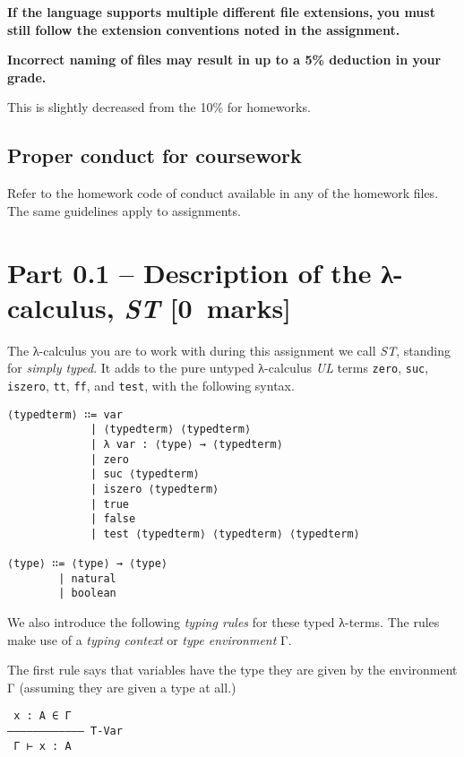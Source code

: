 \documentclass[11pt]{article}
\theoremstyle{definition}
\begin{document}
\begin{center}
\textbf{If the language supports multiple different file extensions,}
\textbf{you must still follow the extension conventions noted in the assignment.}
\end{center}

\begin{center}
\textbf{Incorrect naming of files may result in up to a 5\% deduction in your grade.}
\end{center}
This is slightly decreased from the 10\% for homeworks.

\subsection*{Proper conduct for coursework}
\label{sec:org7f9eaf0}
Refer to the homework code of conduct available in any of the homework files.
The same guidelines apply to assignments.

\section*{Part 0.1 – Description of the λ-calculus, \emph{ST}                 [0 marks]}
\label{sec:org1ee9623}
The λ-calculus you are to work with during this assignment
we call \emph{ST}, standing for \emph{simply typed}.
It adds to the pure untyped λ-calculus \emph{UL}
terms \texttt{zero}, \texttt{suc}, \texttt{iszero}, \texttt{tt}, \texttt{ff}, and \texttt{test}, with the following syntax.
\begin{verbatim}
⟨typedterm⟩ ∷= var
             | ⟨typedterm⟩ ⟨typedterm⟩
             | λ var : ⟨type⟩ → ⟨typedterm⟩
             | zero
             | suc ⟨typedterm⟩
             | iszero ⟨typedterm⟩
             | true
             | false
             | test ⟨typedterm⟩ ⟨typedterm⟩ ⟨typedterm⟩

⟨type⟩ ∷= ⟨type⟩ → ⟨type⟩
        | natural
        | boolean
\end{verbatim}

We also introduce the following \emph{typing rules} for these typed λ-terms.
The rules make use of a \emph{typing context} or \emph{type environment} Γ.

The first rule says that variables have the type they are given
by the environment Γ (assuming they are given a type at all.)
\begin{verbatim}
 x : A ∈ Γ
–––––––––––– T-Var
 Γ ⊢ x : A
\end{verbatim}
\end{document}
